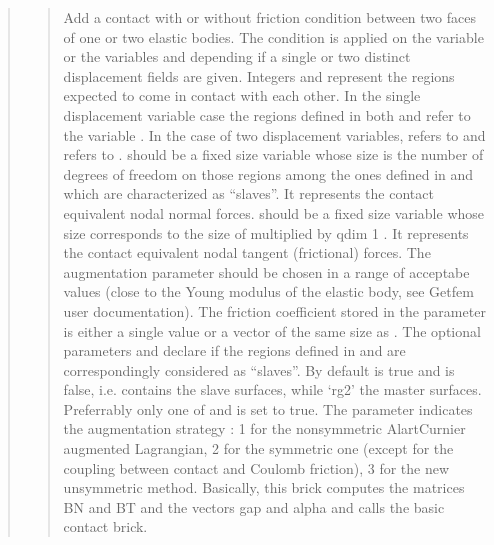 \documentclass[a4paper,11pt,english]{sphinxmanual}
\begin{document}
\begin{quote}
\begin{quote}
\sphinxAtStartPar
Add a contact with or without friction condition between two faces of
one or two elastic bodies. The condition is applied on the variable
 or the variables  and  depending
if a single or two distinct displacement fields are given. Integers
 and  represent the regions expected to come in contact with
each other. In the single displacement variable case the regions defined
in both  and  refer to the variable . In the case
of two displacement variables,  refers to  and 
refers to .  should be a fixed size variable
whose size is the number of degrees of freedom on those regions among
the ones defined in  and  which are characterized as “slaves”.
It represents the contact equivalent nodal normal forces. 
should be a fixed size variable whose size corresponds to the size of
 multiplied by qdim \sphinxhyphen{} 1 . It represents the contact
equivalent nodal tangent (frictional) forces. The augmentation parameter
 should be chosen in a range of acceptabe values (close to the Young
modulus of the elastic body, see Getfem user documentation). The
friction coefficient stored in the parameter  is either a single
value or a vector of the same size as . The optional
parameters  and  declare if the regions defined in 
and  are correspondingly considered as “slaves”. By default
 is true and  is false, i.e.  contains the slave
surfaces, while ‘rg2’ the master surfaces. Preferrably only one of
 and  is set to true.  The parameter 
indicates the augmentation strategy : 1 for the non\sphinxhyphen{}symmetric
Alart\sphinxhyphen{}Curnier augmented Lagrangian, 2 for the symmetric one (except for
the coupling between contact and Coulomb friction),
3 for the new unsymmetric method.
Basically, this brick computes the matrices BN and BT and the vectors
gap and alpha and calls the basic contact brick.
\end{quote}


\end{quote}
\end{document}
